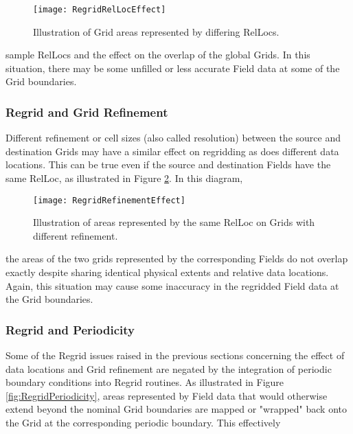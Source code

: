 \begin{center}
\begin{figure}
\caption{Illustration of Grid areas represented by differing RelLocs. }
\label{fig:RegridRelLocEffect}
\resizebox{\textwidth}{!}
  {\texttt{[image: RegridRelLocEffect]}}
\end{figure}
\end{center}

sample RelLocs and the effect on the overlap of the global Grids.  In this
situation, there may be some unfilled or less accurate Field data at some of the
Grid boundaries.


\subsubsection{Regrid and Grid Refinement}

Different refinement or cell sizes (also called resolution) between the source
and destination Grids may have a similar effect on regridding as does different
data locations. This can be true even if the source and destination Fields have
the same RelLoc, as illustrated in Figure \ref{fig:RegridRefinementEffect}.  In
this diagram,

\begin{center}
\begin{figure}
\caption{Illustration of areas represented by the same RelLoc on Grids with
         different refinement. }
\label{fig:RegridRefinementEffect}
\resizebox{\textwidth}{!}
  {\texttt{[image: RegridRefinementEffect]}}
\end{figure}
\end{center}

the areas of the two grids represented by the corresponding Fields do not overlap
exactly despite sharing identical physical extents and relative data locations.
Again, this situation may cause some inaccuracy in the regridded Field data at
the Grid boundaries.


\subsubsection{Regrid and Periodicity}

Some of the Regrid issues raised in the previous sections concerning the effect
of data locations and Grid refinement are negated by the integration of
periodic boundary conditions into Regrid routines.  As illustrated in
Figure \ref{fig:RegridPeriodicity}, areas represented by Field data that
would otherwise extend beyond the nominal Grid boundaries are mapped or "wrapped"
back onto the Grid at the corresponding periodic boundary.  This effectively 

